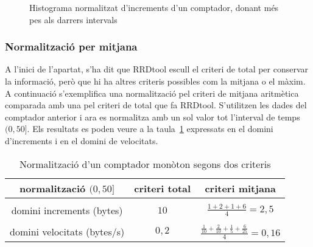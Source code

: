 \begin{figure}[tbp]
  \centering
  \caption{Histograma normalitzat d'increments d'un comptador, donant més pes als darrers intervals}
  \label{fig:velocitats:histograma_pes}
\end{figure}




\subsubsection{Normalització per mitjana}

A l'inici de l'apartat, s'ha dit que RRDtool escull el criteri de total per conservar la informació, però que hi ha altres criteris possibles com la mitjana o el màxim. 
A continuació s'exemplifica una normalització pel criteri de mitjana aritmètica comparada amb una pel criteri de total que fa RRDtool. S'utilitzen les dades del comptador anterior i ara es normalitza amb un sol valor tot l'interval de temps $(0,50]$. Els resultats es poden veure a la taula~\ref{tab:velocitats:counter_criteris} expressats en el domini d'increments i en el domini de velocitats.

\begin{table}[tbp]
\centering
\begin{tabular}{c||c|c}
normalització $(0,50]$  & criteri total  & criteri mitjana  \\ \hline
 & & \\
domini increments (bytes) & $10$  &$\frac{1+2+1+6}{4} = 2{,}5$ \\ 
 & & \\
domini velocitats (bytes/s) & $0{,}2$ & $\frac{ \frac{1}{10} + \frac{2}{10} + \frac{1}{5} +\frac{6}{25} }{4} = 0{,}16$ 
\end{tabular}
\caption{Normalització d'un comptador monòton segons dos criteris}
\label{tab:velocitats:counter_criteris}
\end{table}


